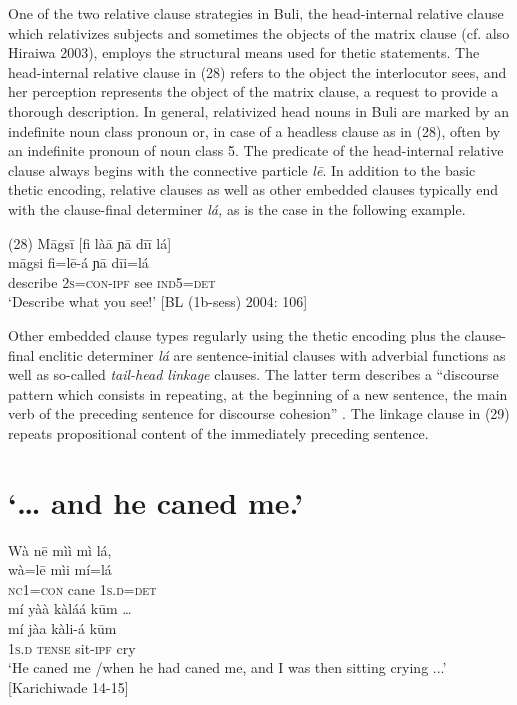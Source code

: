 \documentclass[output=paper]{langsci/langscibook}
\begin{document}
One of the two relative clause strategies in Buli, the head-internal relative clause which relativizes subjects and sometimes the objects of the matrix clause (cf. also Hiraiwa 2003), employs the structural means used for thetic statements. The head-internal relative clause in (28) refers to the object the interlocutor sees, and her perception represents the object of the matrix clause, a request to provide a thorough description. In general, relativized head nouns in Buli are marked by an indefinite noun class pronoun or, in case of a headless clause as in (28), often by an indefinite pronoun of noun class 5. The predicate of the head-internal relative clause always begins with the connective particle \textit{l\={e}}. In addition to the basic thetic encoding, relative clauses as well as other embedded clauses typically end with the clause-final determiner \textit{lá, }as is the case in the following example.

\gll \textup{(28)}  M\={a}gs\={i}    \textup{[}fi là\={a}     ɲ\={a}  d\={i}\={i}   lá\textup{]}\\
\gll \textup{  m\={a}gsi    fi=l\={e}-á     ɲ\={a}  d\={i}i=lá}\\
       describe    2\textsc{s}=\textsc{con}{}-\textsc{ipf}   see     \textsc{ind}5=\textsc{det}\\
\glt ‘Describe what you see!’ [BL (1b-sess) 2004: 106]
\z

Other embedded clause types regularly using the thetic encoding plus the clause-final enclitic determiner \textit{lá} are sentence-initial clauses with adverbial functions as well as so-called \textit{tail-head linkage} clauses. The latter term describes a “discourse pattern which consists in repeating, at the beginning of a new sentence, the main verb of the preceding sentence for discourse cohesion” \citep[109]{Guillaume2011}. The linkage clause in (29) repeats propositional content of the immediately preceding sentence. 

\chapter[‘… and he caned me.’]{‘… and he caned me.’}
\gll   Wà  n\={e}  mìì  mì   lá,\\
\gll \textup{  wà=l\={e}  mìi  mí=lá}\\
     \textsc{  nc}1=\textsc{con}\textsubscript{  }cane  1\textsc{s}.\textsc{d}=\textsc{det}\\
\gll   mí    yàà  kàláá    k\={u}m …\\
\gll \textup{  mí    jàa  kàli-á    k\={u}m}\\
       1\textsc{s}.\textsc{d}  \textsc{tense}  sit-\textsc{ipf}    cry\\
\glt ‘He caned me /when he had caned me, and I was then sitting crying ...’ [Karichiwade 14-15]
\z
\end{document}
